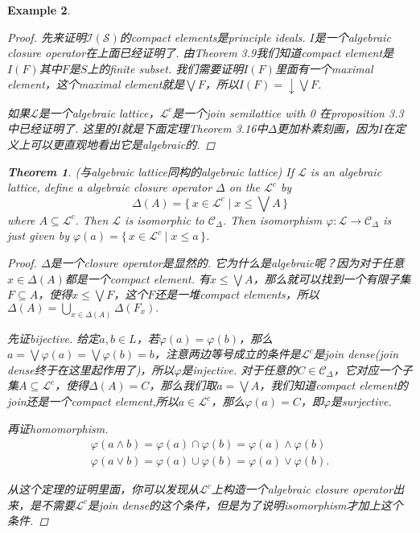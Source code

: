 \documentclass{article}
\newtheorem{theorem}{Theorem}[section]
\newtheorem{example}[theorem]{Example}
\newcommand*{\xfunc}[4]{{#2}\colon{#3}{#1}{#4}}
\newcommand*{\func}[3]{\xfunc{\to}{#1}{#2}{#3}}
\newcommand\Set[2]{\{\,#1\mid#2\,\}} %
\newcommand\slattice{\mathcal{S}}
\newcommand\lattice{\mathcal{L}}
\begin{document}
\begin{example}
\begin{proof}
先来证明$\mathcal{I}(\slattice)$的compact elements是principle ideals. $I$是一个algebraic closure operator在上面已经证明了. 由Theorem 3.9我们知道compact element是$I(F)$其中$F$是$S$上的finite subset. 我们需要证明$I(F)$里面有一个maximal element，这个maximal element就是$\bigvee F$，所以$I(F) = \downarrow \bigvee F$.

如果$\lattice$是一个algebraic lattice，$\lattice^c$是一个join semilattice with 0 在proposition 3.3中已经证明了. 这里的$I$就是下面定理Theorem 3.16中$\Delta$更加朴素刻画，因为$I$在定义上可以更直观地看出它是algebraic的.

\end{proof}

\newpage
\begin{theorem}
\rm {\color{red}(与algebraic lattice同构的algebraic lattice)} If $\lattice$ is an algebraic lattice, define a algebraic closure operator $\Delta$ on the $\lattice^c$ by
$$
	\Delta(A) = \Set{x \in \lattice^c}{x \leq \bigvee A}
$$ 
where $A \subseteq \lattice^c$. Then $\lattice$ is isomorphic to $\mathcal{C}_\Delta$. Then isomorphism $\func{\varphi}{\lattice}{\mathcal{C}_\Delta}$ is just given by $\varphi(a) = \Set{x \in \lattice^c}{x \leq a}$.
\end{theorem}

\begin{proof}
$\Delta$是一个closure operator是显然的. 它为什么是algebraic呢？因为对于任意$x \in \Delta(A)$都是一个compact element. 有$x \leq \bigvee A$，那么就可以找到一个有限子集$F \subseteq A$，使得$x \leq \bigvee F$，这个$F$还是一堆compact elements，所以$\Delta(A) = \bigcup\limits_{x \in \Delta(A)} \Delta(F_x).$

先证bijective. 给定$a,b \in L$，若$\varphi(a) = \varphi(b)$，那么$a = \bigvee \varphi(a) = \bigvee \varphi(b) = b$，注意两边等号成立的条件是$\lattice^c$是join dense({join dense终于在这里起作用了})，所以$\varphi$是injective. 对于任意的$C \in \mathcal{C}_\Delta$，它对应一个子集$A \subseteq \lattice^c$，使得$\Delta(A) = C$，那么我们取$a = \bigvee A$，我们知道compact element的join还是一个compact element,所以$a \in \lattice^c$，那么$\varphi(a) = C$，即$\varphi$是surjective.

再证homomorphism. 
$$
\begin{aligned}
\varphi(a \wedge b) = \varphi(a) \cap \varphi(b) = \varphi(a) \wedge \varphi(b) \\
\varphi(a \vee b) = \varphi(a) \cup \varphi(b) = \varphi(a) \vee \varphi(b).
\end{aligned}
$$

{\color{blue} 从这个定理的证明里面，你可以发现从$\lattice^c$上构造一个algebraic closure operator出来，是不需要$\lattice^c$是join dense的这个条件，但是为了说明isomorphism才加上这个条件}.
\end{proof}	

\end{example}
\end{document}
